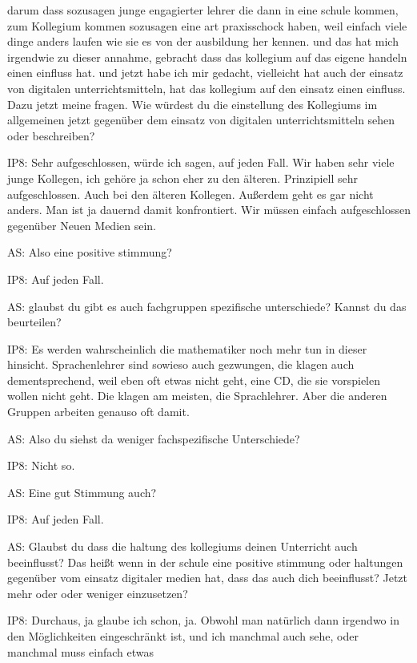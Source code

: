 \documentclass[fontsize=11pt,paper=a4]{scrbook}
\begin{document}
{\begin{itemize*}
		darum dass sozusagen junge engagierter
		lehrer die dann in eine	schule kommen, zum Kollegium kommen sozusagen
		eine art praxisschock haben, weil
		einfach viele dinge anders laufen wie
		sie es von der ausbildung her kennen. und
		das hat mich irgendwie zu dieser annahme, gebracht dass das
		kollegium auf das eigene handeln einen
		einfluss hat. und jetzt habe ich mir gedacht,
		vielleicht hat auch der einsatz von
		digitalen unterrichtsmitteln, hat
		das kollegium auf den einsatz 
		einen einfluss. Dazu jetzt meine
		fragen. Wie würdest du die einstellung
		des Kollegiums im allgemeinen jetzt
		 gegenüber dem
		einsatz von digitalen unterrichtsmitteln sehen oder
		beschreiben?
		\item[IP8:] Sehr aufgeschlossen, würde ich sagen, auf jeden Fall. Wir haben sehr viele junge Kollegen, ich gehöre ja schon eher zu den älteren. Prinzipiell sehr aufgeschlossen. Auch bei den älteren Kollegen. Außerdem geht es gar nicht anders. Man ist ja dauernd damit konfrontiert. Wir müssen einfach aufgeschlossen gegenüber Neuen Medien sein.
		\item[AS:] Also eine positive stimmung?
		\item[IP8:] Auf jeden Fall.
		\item[AS:] 	glaubst du gibt es auch fachgruppen
		spezifische unterschiede? Kannst du das beurteilen?
		\item[IP8:] Es werden
		wahrscheinlich die mathematiker noch
		mehr tun in dieser hinsicht. Sprachenlehrer sind sowieso auch gezwungen, die
		klagen auch dementsprechend, weil eben oft
		etwas nicht geht, eine CD, die sie vorspielen wollen nicht geht. Die klagen am meisten, die Sprachlehrer. Aber die anderen Gruppen arbeiten genauso oft damit.
		\item[AS:] Also du siehst da weniger fachspezifische Unterschiede?
		\item[IP8:]Nicht so.
		\item[AS:] Eine gut Stimmung auch?
		\item[IP8:] Auf jeden Fall.
		\item[AS:] Glaubst du dass die haltung
		des kollegiums deinen Unterricht auch beeinflusst? Das heißt
		wenn in der schule eine positive
		stimmung oder haltungen gegenüber vom einsatz
		digitaler medien hat, dass das auch
		dich beeinflusst? Jetzt mehr oder oder weniger einzusetzen?
		\item[IP8:] Durchaus, ja glaube ich schon, ja. Obwohl man natürlich dann irgendwo in
		den Möglichkeiten eingeschränkt ist, und ich manchmal auch sehe, oder manchmal muss einfach etwas

\end{itemize*}}
\end{document}
